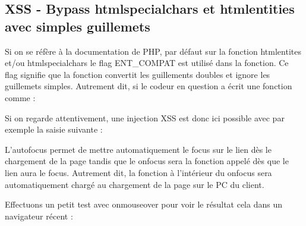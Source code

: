\documentclass{article}
\begin{document}
\subsection{XSS - Bypass htmlspecialchars et htmlentities avec simples guillemets}
Si on se réfère à la documentation de PHP, par défaut sur la fonction htmlentites et/ou htmlspecialchars le flag ENT\_COMPAT est utilisé dans la fonction. Ce flag signifie que la fonction convertit les guillements doubles et ignore les guillemets simples. Autrement dit, si le codeur en question a écrit une fonction comme :
\vspace{0.2cm}\\
\vspace{0.2cm}

Si on regarde attentivement, une injection XSS est donc ici possible avec par exemple la saisie suivante :
\vspace{0.2cm}\\
\vspace{0.2cm}

L'autofocus permet de mettre automatiquement le focus sur le lien dès le chargement de la page tandis que le onfocus sera la fonction appelé dès que le lien aura le focus. Autrement dit, la fonction à l'intérieur du onfocus sera automatiquement chargé au chargement de la page sur le PC du client.

Effectuons un petit test avec onmouseover pour voir le résultat cela dans un navigateur récent :
\vspace{0.2cm}\\
\vspace{0.2cm}
\end{document}

